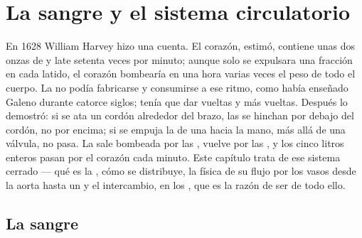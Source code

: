 \chapter{La sangre y el sistema circulatorio}\label{ch:b2:blood-circulation}

En 1628 William Harvey hizo una cuenta. El corazón, estimó, contiene unas
dos onzas de  y late setenta veces por minuto; aunque solo se
expulsara una fracción en cada latido, el corazón bombearía en una hora
varias veces el peso de todo el cuerpo. La  no podía fabricarse y
consumirse a ese ritmo, como había enseñado Galeno durante catorce
siglos; tenía que dar vueltas y más vueltas. Después lo demostró: si se
ata un cordón alrededor del brazo, las  se hinchan por debajo del
cordón, no por encima; si se empuja la  de una  hacia la mano,
más allá de una válvula, no pasa. La  sale bombeada por las
, vuelve por las , y los cinco litros enteros pasan por el
corazón cada minuto. Este capítulo trata de ese sistema cerrado --- qué es
la , cómo se distribuye, la física de su flujo por los vasos desde
la aorta hasta un  y el intercambio, en los , que es la
razón de ser de todo ello.

\section{La sangre}

